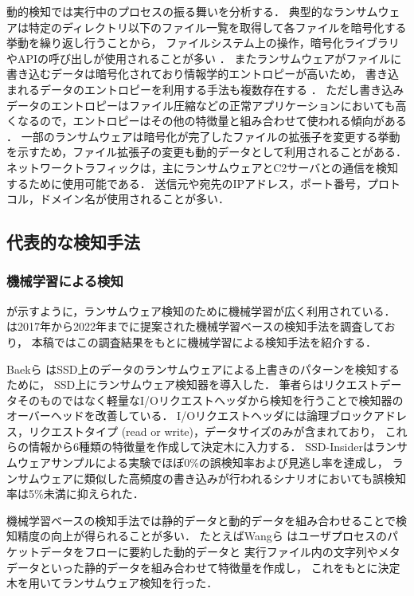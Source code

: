 動的検知では実行中のプロセスの振る舞いを分析する．
典型的なランサムウェアは特定のディレクトリ以下のファイル一覧を取得して各ファイルを暗号化する挙動を繰り返し行うことから，
ファイルシステム上の操作，暗号化ライブラリやAPIの呼び出しが使用されることが多い \cite{Evolution-Ransomware}．
またランサムウェアがファイルに書き込むデータは暗号化されており情報学的エントロピーが高いため，
書き込まれるデータのエントロピーを利用する手法も複数存在する \cite{kharaz2016unveil,kharraz2017redemption}．
ただし書き込みデータのエントロピーはファイル圧縮などの正常アプリケーションにおいても高くなるので，エントロピーはその他の特徴量と組み合わせて使われる傾向がある \cite{berrueta2019survey}．
一部のランサムウェアは暗号化が完了したファイルの拡張子を変更する挙動を示すため，ファイル拡張子の変更も動的データとして利用されることがある\cite{medhat2018new}．
ネットワークトラフィックは，主にランサムウェアとC2サーバとの通信を検知するために使用可能である．
送信元や宛先のIPアドレス，ポート番号，プロトコル，ドメイン名が使用されることが多い\cite{Evolution-Ransomware}．

\subsection{代表的な検知手法}
\subsubsection{機械学習による検知}
が示すように，ランサムウェア検知のために機械学習が広く利用されている．
\cite{alraizza2023ransomware}は2017年から2022年までに提案された機械学習ベースの検知手法を調査しており，
本稿ではこの調査結果をもとに機械学習による検知手法を紹介する．

Baekら \cite{baek2018ssd} はSSD上のデータのランサムウェアによる上書きのパターンを検知するために，
SSD上にランサムウェア検知器を導入した．
筆者らはリクエストデータそのものではなく軽量なI/Oリクエストヘッダから検知を行うことで検知器のオーバーヘッドを改善している．
I/Oリクエストヘッダには論理ブロックアドレス，リクエストタイプ (read or write)，データサイズのみが含まれており，
これらの情報から6種類の特徴量を作成して決定木に入力する．
SSD-Insiderはランサムウェアサンプルによる実験でほぼ0\%の誤検知率および見逃し率を達成し，
ランサムウェアに類似した高頻度の書き込みが行われるシナリオにおいても誤検知率は5\%未満に抑えられた．

機械学習ベースの検知手法では静的データと動的データを組み合わせることで検知精度の向上が得られることが多い\cite{alraizza2023ransomware}．
たとえばWangら \cite{wan2018feature}はユーザプロセスのパケットデータをフローに要約した動的データと
実行ファイル内の文字列やメタデータといった静的データを組み合わせて特徴量を作成し，
これをもとに決定木を用いてランサムウェア検知を行った．


